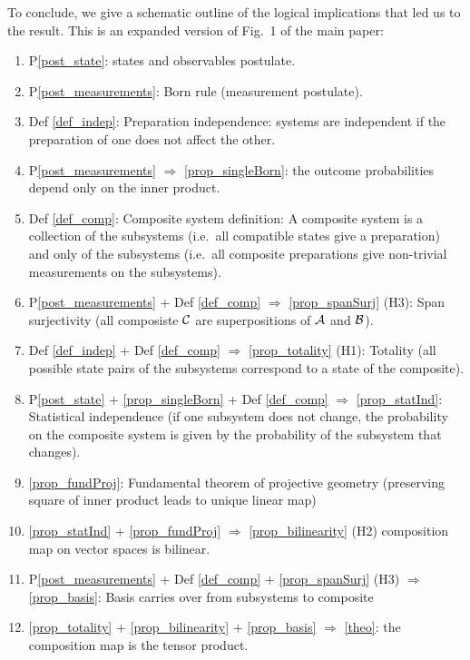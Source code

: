 \documentclass[aps,prl,amsmath,amssymb,twocolumn,nofootinbib]{revtex4}
\theoremstyle{plain}
\theoremstyle{definition}
\theoremstyle{remark}
\begin{document}
To conclude, we give a schematic outline of the logical implications
that led us to the result. This is an expanded version of Fig.~1 of
the main paper:
\begin{enumerate}
\item P\ref{post_state}: states and observables postulate.

\item P\ref{post_measurements}: Born rule (measurement postulate). 

\item Def \ref{def_indep}: Preparation independence: systems are independent if the preparation of one does not affect the other.

\item P\ref{post_measurements} $\Rightarrow$ \ref{prop_singleBorn}: the outcome probabilities depend only on the
  inner product.
  
\item Def \ref{def_comp}: Composite system definition: A composite system is a
  collection of the subsystems (i.e.~all compatible states give a preparation) and only of the subsystems
  (i.e.~all composite preparations give non-trivial measurements on the
  subsystems).


\item P\ref{post_measurements} + Def \ref{def_comp} $\Rightarrow$ \ref{prop_spanSurj} (H3): Span
  surjectivity (all composiste $\cal C$ are superpositions of ${\cal A}$ and ${\cal B}$).

\item Def \ref{def_indep} + Def \ref{def_comp} $\Rightarrow$ \ref{prop_totality} (H1):
  Totality (all possible state pairs of the subsystems correspond to a state of the composite). 

\item P\ref{post_state} + \ref{prop_singleBorn} +  Def \ref{def_comp} $\Rightarrow$ \ref{prop_statInd}: Statistical
  independence (if one subsystem does not change, the probability on the composite system is given by the probability of the subsystem that changes).

\item \ref{prop_fundProj}: Fundamental theorem of projective geometry (preserving square of inner product leads to unique linear map)
  
\item \ref{prop_statInd} + \ref{prop_fundProj} $\Rightarrow$ \ref{prop_bilinearity} (H2) composition map on vector spaces is bilinear.

\item P\ref{post_measurements} + Def \ref{def_comp} + \ref{prop_spanSurj} (H3) $\Rightarrow$ \ref{prop_basis}: Basis
  carries over from subsystems to composite

\item \ref{prop_totality} + \ref{prop_bilinearity} + \ref{prop_basis} $\Rightarrow$ \ref{theo}: the composition map is the tensor product.
\end{enumerate}
\end{document}
